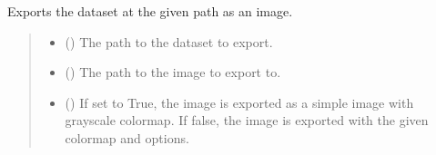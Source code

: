 \documentclass[letterpaper,10pt,english]{sphinxmanual}
\begin{document}
\begin{fulllineitems}
\begin{fulllineitems}
\begin{quote}
\begin{description}
\end{description}\end{quote}

\end{fulllineitems}


\begin{fulllineitems}
\label{\detokenize{source/_autosummary/HDF5_BLS.Wrapper:HDF5_BLS.Wrapper.export_image}}
\pysigstartsignatures
\pysiglinewithargsret
{}
{\sphinxparamcomma {}\sphinxparamcomma {}\sphinxparamcomma {}\sphinxparamcomma {}\sphinxparamcomma {}\sphinxparamcomma {}\sphinxparamcomma {}\sphinxparamcomma {}\sphinxparamcomma {}}
{}
\pysigstopsignatures
\sphinxAtStartPar
Exports the dataset at the given path as an image.
\begin{quote}\begin{description}
\begin{itemize}
\item {} 
\sphinxAtStartPar
{} () \textendash{} The path to the dataset to export.

\item {} 
\sphinxAtStartPar
{} () \textendash{} The path to the image to export to.

\item {} 
\sphinxAtStartPar
{} (\sphinxstyleliteralemphasis{\sphinxupquote{, }}) \textendash{} If set to True, the image is exported as a simple image with grayscale colormap. If false, the image is exported with the given colormap and options.


\end{itemize}
\end{description}
\end{quote}
\end{fulllineitems}
\end{fulllineitems}
\end{document}
